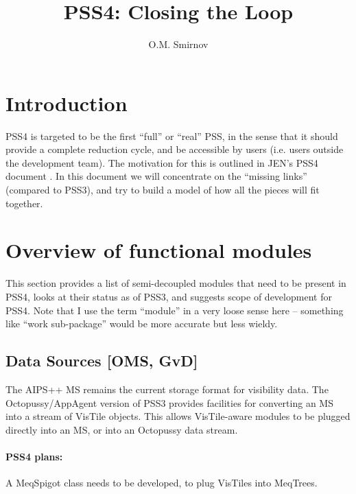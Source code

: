 \documentclass[12pt]{article}
\title{PSS4: Closing the Loop}
\author{O.M. Smirnov}
\begin{document}
\sloppy

\newcommand{\url}[1]{{\tt #1}}

\maketitle


\section{Introduction}

  PSS4 is targeted to be the first ``full'' or ``real'' PSS, in the sense that
  it should provide a complete reduction cycle, and be accessible by users
  (i.e. users outside the development team). The motivation for this is
  outlined in JEN's PSS4 document \cite{PSS4}. In this document we will
  concentrate on the ``missing links'' (compared to PSS3), and try to build a
  model of how all the pieces will fit together.

\section{Overview of functional modules}

  This section provides a list of semi-decoupled modules that need to be
  present in PSS4, looks at their status as of PSS3, and suggests scope of
  development for PSS4. Note that I use the term ``module'' in a very loose
  sense here --  something like ``work sub-package'' would be more accurate but
  less wieldy.

\subsection{Data Sources [OMS, GvD]}

  The AIPS++ MS remains the current storage format for visibility data. The
  Octopussy/AppAgent version of PSS3 provides facilities for converting an MS
  into a stream of VisTile objects. This allows VisTile-aware modules to be
  plugged directly into an MS, or into an Octopussy data stream.

  \paragraph{PSS4 plans:} A MeqSpigot class needs to be developed, to plug
  VisTiles into MeqTrees.
  
\end{document}
